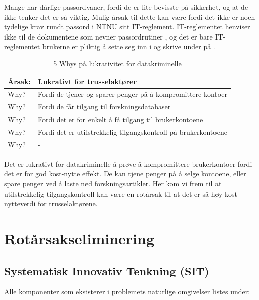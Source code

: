 Mange har dårlige passordvaner, fordi de er lite bevisste på sikkerhet, og at de ikke tenker det er så viktig. Mulig årsak til dette kan være fordi det ikke er noen tydelige krav rundt passord i NTNU sitt IT-reglement. IT-reglementet henviser ikke til de dokumentene som nevner passordrutiner \cite{ITReg}, og det er bare IT-reglementet brukerne er pliktig å sette seg inn i og skrive under på \cite{ITsikkerhet}. 

\begin{table} [H]
    \centering
    \begin{tabular}{ | m{5em} | m{30em} | }
        \hline
            \cellcolor{yellow} Årsak: & \cellcolor{yellow} Lukrativt for trusselaktører \\
        \hline
            Why? & Fordi de tjener og sparer penger på å kompromittere kontoer \\
        \hline
            Why? & Fordi de får tilgang til forskningsdatabaser \\
        \hline
            Why? & Fordi det er for enkelt å få tilgang til brukerkontoene \\
        \hline
            Why? & Fordi det er utilstrekkelig tilgangskontroll på brukerkontoene \\
        \hline
            Why? & - \\
        \hline
    \end{tabular}
    \caption[5 Whys: Lukrativt for datakriminelle]{5 Whys på lukrativitet for datakriminelle}
    \label{5Whys-passordvaner}
\end{table}

Det er lukrativt for datakriminelle å prøve å kompromittere brukerkontoer fordi det er for god kost-nytte effekt. De kan tjene penger på å selge kontoene, eller spare penger ved å laste ned forskningsartikler. Her kom vi frem til at utilstrekkelig tilgangskontroll kan være en rotårsak til at det er så høy kost-nytteverdi for trusselaktørene.

\section{Rotårsakseliminering}

\subsection{Systematisk Innovativ Tenkning (SIT)}
Alle komponenter som eksisterer i problemets naturlige omgivelser listes under:

